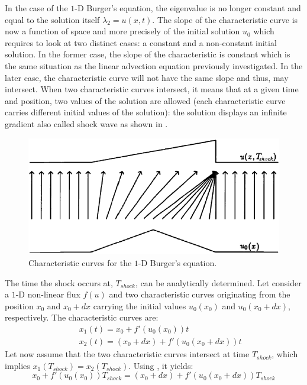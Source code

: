 %
In the case of the $1$-D Burger's equation, the eigenvalue is no longer constant and equal to the solution itself $\lambda_2 = u(x,t)$. The slope of the characteristic curve is now a function of space and more precisely of the initial solution $u_0$ which requires to look at two distinct cases: a constant and a non-constant initial solution. In the former case, the slope of the characteristic is constant which is the same situation as the linear advection equation previously investigated. In the later case, the characteristic curve will not have the same slope and thus, may intersect. When two characteristic curves intersect, it means that at a given time and position, two values of the solution are allowed (each characteristic curve carries different initial values of the solution): the solution displays an infinite gradient also called shock wave as shown in . 
%
\begin{figure}[H]
\centering
\includegraphics[width=\textwidth]{figures/shock_formation_burger.png}
\caption{Characteristic curves for the $1$-D Burger's equation.}
\label{fig:char_curve_bg_sct1b}
\end{figure}
%
The time the shock occurs at, $T_{shock}$, can be analytically determined. Let consider a $1$-D non-linear flux $f(u)$ and two characteristic curves originating from the position $x_0$ and $x_0+dx$ carrying the initial values $u_0(x_0)$ and $u_0(x_0+dx)$, respectively. The characteristic curves are:
%
\begin{eqnarray}\label{eq:cc1_sct1b}
&&x_1(t) = x_0 + f'(u_0(x_0)) t \nonumber \\ 
&&x_2(t) = (x_0 + dx) + f'(u_0(x_0+dx)) t 
\end{eqnarray}
%
Let now assume that the two characteristic curves intersect at time $T_{shock}$, which implies $x_1(T_{shock}) = x_2(T_{shock})$. Using , it yields:
%
\begin{equation}\label{eq:cc1b_sct1b}
x_0 + f'(u_0(x_0)) T_{shock} = (x_0 + dx) + f'(u_0(x_0+dx)) T_{shock}
\end{equation}
